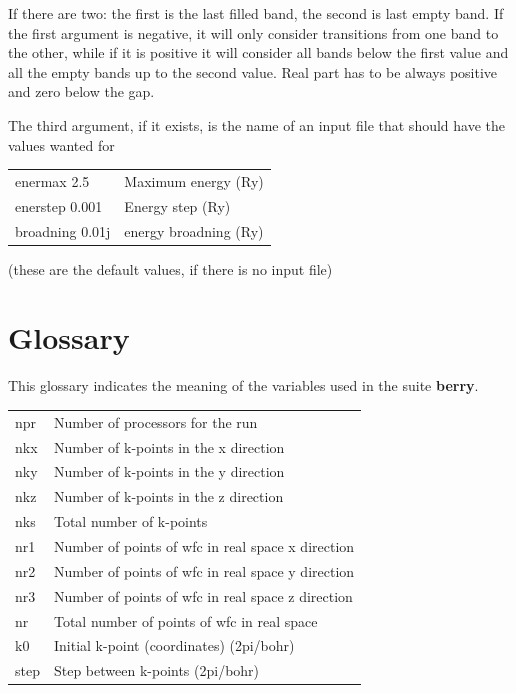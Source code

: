 \documentclass[a4paper,12pt]{report}
\begin{document}
 If there are two:  the first is the last filled band, the second is last empty band.
 If the first argument is negative, it will only consider transitions from one band to the other, while if it is positive it will consider all bands below the first value and all the empty bands up to the second value.
 Real part has to be always positive and zero below the gap.

 The third argument, if it exists, is the name of an input file that should have the values wanted for\medskip

\begin{tabularx}{\textwidth}{Xl}
 enermax  2.5            & Maximum energy (Ry)\\
 enerstep  0.001         & Energy step (Ry)\\
 broadning  0.01j        & energy broadning (Ry) \\
\end{tabularx}
\medskip

(these are the default values, if there is no input file)







\chapter{Glossary}

This glossary indicates the meaning of the variables used in the suite \textbf{berry}.
\vspace{0.5cm}

\begin{tabularx}{\textwidth}{Xl}
 npr            & Number of processors for the run \\

 nkx            & Number of k-points in the x direction \\
 nky            & Number of k-points in the y direction \\
 nkz            & Number of k-points in the z direction \\
 nks            & Total number of k-points \\

 nr1            & Number of points of wfc in real space x direction \\
 nr2            & Number of points of wfc in real space y direction \\
 nr3            & Number of points of wfc in real space z direction \\
 nr             & Total number of points of wfc in real space \\

 k0             & Initial k-point (coordinates) (2pi/bohr) \\
 step           & Step between k-points (2pi/bohr) \\
\end{tabularx}
\vspace{0.5cm}
\end{document}
